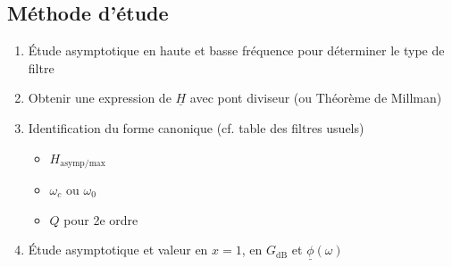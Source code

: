\documentclass[openany]{book}
\begin{document}
\subsection{Méthode d'étude}
\begin{enumerate}
    \item Étude asymptotique en haute et basse fréquence pour déterminer le type de filtre
    \item Obtenir une expression de $ \underline{H} $ avec pont diviseur (ou Théorème de Millman)
    \item Identification du forme canonique (cf. table des filtres usuels)
    \begin{itemize}
        \item $H_\text{asymp/max}$
        \item $\omega_c$ ou $\omega_0$
        \item $Q$ pour 2e ordre
    \end{itemize}
    \item Étude asymptotique et valeur en $x = 1$, en $ G_{\text{dB}} $ et $ \underline{\phi}(\omega) $
\end{enumerate}
\end{document}
